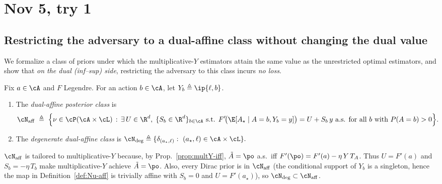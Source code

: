\clearpage
\section{Nov 5, try 1}
\subsection{Restricting the adversary to a dual-affine class without changing the dual value}

We formalize a class of priors under which the multiplicative-$Y$ estimators attain the
same value as the unrestricted optimal estimators, and show that \emph{on the dual (inf--sup) side},
restricting the adversary to this class incurs \emph{no loss}.

\begin{definition}\label{def:Nu-aff}
    Fix $a\in\cA$ and $F$ Legendre. For an action $b\in\cA$, let $Y_b \triangleq \ip{\ell,b}$.

    \begin{enumerate}
        \item The \emph{dual-affine posterior class} is
              \[
                  \cN_{\mathrm{aff}}
                  \;\triangleq\;
                  \Big\{
                  \nu\in\cP(\cA\times\cL)\,:\,\exists\,U\in\R^d,\;\{S_b\in\R^d\}_{b\in\cA}
                  \text{ s.t. }F'\!\big(\E[A_\star\mid A=b,Y_b=y]\big)=U+S_b\,y
                  \ \text{a.s. for all $b$ with $P(A=b)>0$}
                  \Big\}.
              \]
        \item The \emph{degenerate dual-affine class} is
              \(
              \cN_{\mathrm{deg}}\triangleq\{\delta_{(a_\star,\ell)}:\ (a_\star,\ell)\in\cA\times\cL\}.
              \)
    \end{enumerate}
\end{definition}

\begin{remark}
    $\cN_{\mathrm{aff}}$ is tailored to multiplicative-$Y$ because, by
    Prop.~\ref{prop:multY-iff}, $\tilde{A}=\po$ a.s.\ iff $F'(\po)=F'(a)-\eta\,Y\,T_A$.
    Thus $U=F'(a)$ and $S_b=-\eta\,T_b$ make multiplicative-$Y$ achieve $\tilde{A}=\po$.
    Also, every Dirac prior is in $\cN_{\mathrm{aff}}$ (the conditional support of $Y_b$ is a singleton, hence the map in Definition~\ref{def:Nu-aff} is trivially affine with $S_b=0$ and $U=F'(a_\star)$), so $\cN_{\mathrm{deg}}\subset\cN_{\mathrm{aff}}$.
\end{remark}

